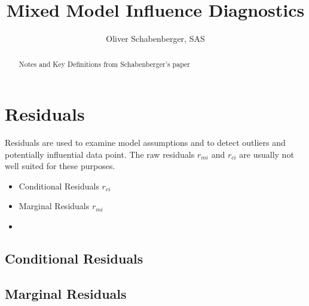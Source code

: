 \documentclass[]{article}
\title{Mixed Model Influence Diagnostics}
\author{Oliver Schabenberger, SAS}
\begin{document}
\maketitle


\begin{abstract}
Notes and Key Definitions from Schabenberger's paper
\end{abstract}
\section*{Residuals}

Residuals are used to examine model assumptions and to detect outliers and potentially influential data
point. The raw residuals $r_{mi}$ and $r_{ci}$ are usually not well suited for these purposes.

\begin{itemize}
\item Conditional Residuals $r_{ci}$
\item Marginal Residuals $r_{mi}$
\item 
\end{itemize}
\subsection*{Conditional Residuals}

\subsection*{Marginal Residuals}
\end{document}
